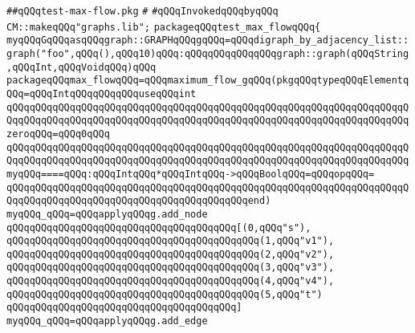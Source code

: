 \label{src/lib/graph/test-max-flow.pkg}
\verb|##qQQqtest-max-flow.pkg|\newline
\verb|#|\newline
\newline
\verb|#qQQqInvokedqQQqbyqQQq|\newline
\newline
\verb|CM::makeqQQq"graphs.lib";|\newline
\verb|packageqQQqtest_max_flowqQQq{|\newline
\newline
\verb|myqQQqGqQQqasqQQqgraph::GRAPHqQQqgqQQq=qQQqdigraph_by_adjacency_list::graph("foo",qQQq(),qQQq10)qQQq:qQQqqQQqqQQqqQQqgraph::graph(qQQqString,qQQqInt,qQQqVoidqQQq)qQQq|\newline
\newline
\verb|packageqQQqmax_flowqQQq=qQQqmaximum_flow_gqQQq(pkgqQQqtypeqQQqElementqQQq=qQQqIntqQQqqQQqqQQquseqQQqint|\newline
\verb|qQQqqQQqqQQqqQQqqQQqqQQqqQQqqQQqqQQqqQQqqQQqqQQqqQQqqQQqqQQqqQQqqQQqqQQqqQQqqQQqqQQqqQQqqQQqqQQqqQQqqQQqqQQqqQQqqQQqqQQqqQQqqQQqqQQqqQQqqQQqzeroqQQq=qQQq0qQQq|\newline
\verb|qQQqqQQqqQQqqQQqqQQqqQQqqQQqqQQqqQQqqQQqqQQqqQQqqQQqqQQqqQQqqQQqqQQqqQQqqQQqqQQqqQQqqQQqqQQqqQQqqQQqqQQqqQQqqQQqqQQqqQQqqQQqqQQqqQQqqQQqqQQqmyqQQq====qQQq:qQQqIntqQQq*qQQqIntqQQq->qQQqBoolqQQq=qQQqopqQQq=|\newline
\verb|qQQqqQQqqQQqqQQqqQQqqQQqqQQqqQQqqQQqqQQqqQQqqQQqqQQqqQQqqQQqqQQqqQQqqQQqqQQqqQQqqQQqqQQqqQQqqQQqqQQqqQQqqQQqqQQqend)|\newline
\verb|myqQQq_qQQq=qQQqapplyqQQqg.add_node|\newline
\verb|qQQqqQQqqQQqqQQqqQQqqQQqqQQqqQQqqQQqqQQq[(0,qQQq"s"),|\newline
\verb|qQQqqQQqqQQqqQQqqQQqqQQqqQQqqQQqqQQqqQQqqQQq(1,qQQq"v1"),|\newline
\verb|qQQqqQQqqQQqqQQqqQQqqQQqqQQqqQQqqQQqqQQqqQQq(2,qQQq"v2"),|\newline
\verb|qQQqqQQqqQQqqQQqqQQqqQQqqQQqqQQqqQQqqQQqqQQq(3,qQQq"v3"),|\newline
\verb|qQQqqQQqqQQqqQQqqQQqqQQqqQQqqQQqqQQqqQQqqQQq(4,qQQq"v4"),|\newline
\verb|qQQqqQQqqQQqqQQqqQQqqQQqqQQqqQQqqQQqqQQqqQQq(5,qQQq"t")|\newline
\verb|qQQqqQQqqQQqqQQqqQQqqQQqqQQqqQQqqQQqqQQq]|\newline
\verb|myqQQq_qQQq=qQQqapplyqQQqg.add_edge|\newline
